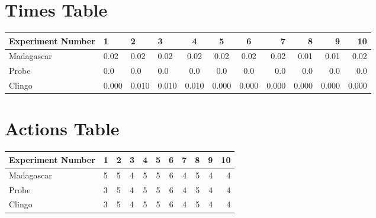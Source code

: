 \documentclass[8pt]{article}
\begin{document}
\begin{landscape}
\section{Times Table}\begin{tabular}{ | l | l | l | l | c | c | c | r | r | r | r | }\hline
Experiment Number & 1 & 2 & 3 & 4 & 5 & 6 & 7 & 8 & 9 & 10\\  \hline
Madagascar & 0.02 & 0.02 & 0.02 & 0.02 & 0.02 & 0.02 & 0.02 & 0.01 & 0.01 & 0.02\\  \hline
Probe & 0.0 & 0.0 & 0.0 & 0.0 & 0.0 & 0.0 & 0.0 & 0.0 & 0.0 & 0.0\\  \hline
Clingo & 0.000 & 0.010 & 0.010 & 0.010 & 0.000 & 0.000 & 0.000 & 0.000 & 0.000 & 0.000\\  \hline
\end{tabular}
\section{Actions Table}\begin{tabular}{ | l | l | l | l | c | c | c | r | r | r | r | }\hline
Experiment Number & 1 & 2 & 3 & 4 & 5 & 6 & 7 & 8 & 9 & 10\\ \hline
 Madagascar & 5 & 5 & 4 & 5 & 5 & 6 & 4 & 5 & 4 & 4\\ \hline
 Probe & 3 & 5 & 4 & 5 & 5 & 6 & 4 & 5 & 4 & 4\\ \hline
 Clingo & 3 & 5 & 4 & 5 & 5 & 6 & 4 & 5 & 4 & 4\\ \hline
\end{tabular}
\end{landscape}
\end{document}
